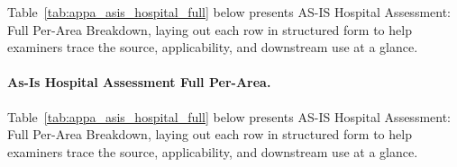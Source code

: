 {\tablestripes\tablefontsize

\noindent Table~\ref{tab:appa_asis_hospital_full} below presents AS-IS Hospital Assessment: Full Per-Area Breakdown, laying out each row in structured form to help examiners trace the source, applicability, and downstream use at a glance. %
\paragraph{As-Is Hospital Assessment Full Per-Area.} %
\noindent Table~\ref{tab:appa_asis_hospital_full} below presents AS-IS Hospital Assessment: Full Per-Area Breakdown, laying out each row in structured form to help examiners trace the source, applicability, and downstream use at a glance. %



}
